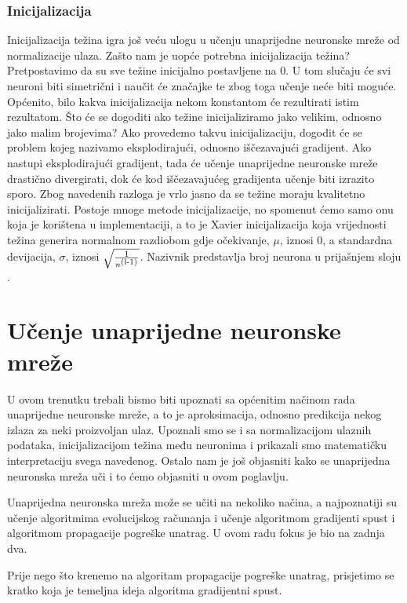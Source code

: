 \documentclass[times, utf8, zavrsni]{fer}
\begin{document}
\subsubsection{Inicijalizacija}
Inicijalizacija  težina igra još veću ulogu u učenju unaprijedne neuronske mreže od normalizacije ulaza. Zašto nam je uopće potrebna inicijalizacija težina? Pretpostavimo da su sve težine inicijalno postavljene na 0. U tom slučaju će svi neuroni biti simetrični i naučit će značajke te zbog toga učenje neće biti moguće. Općenito, bilo kakva inicijalizacija nekom konstantom će rezultirati istim rezultatom. Što će se dogoditi ako težine inicijaliziramo jako velikim, odnosno jako malim brojevima? Ako provedemo takvu inicijalizaciju, dogodit će se problem kojeg nazivamo eksplodirajući, odnosno iščezavajući gradijent. Ako nastupi eksplodirajući gradijent, tada će učenje unaprijedne neuronske mreže drastično divergirati, dok će kod iščezavajućeg gradijenta učenje biti izrazito sporo. Zbog navedenih razloga je vrlo jasno da se težine moraju kvalitetno inicijalizirati. Postoje mnoge metode inicijalizacije, no spomenut ćemo samo onu koja je korištena u implementaciji, a to je Xavier inicijalizacija koja vrijednosti težina generira normalnom razdiobom gdje očekivanje, $\mu$, iznosi 0, a standardna devijacija, $\sigma$, iznosi $\sqrt{\frac{1}{n\textsuperscript{(l-1)}}}$. Nazivnik predstavlja broj neurona u prijašnjem sloju \citep{init}.

\section{Učenje unaprijedne neuronske mreže}
U ovom trenutku trebali bismo biti upoznati sa općenitim načinom rada unaprijedne neuronske mreže, a to je aproksimacija, odnosno predikcija nekog izlaza za neki proizvoljan ulaz. Upoznali smo se i sa normalizacijom ulaznih podataka, inicijalizacijom težina među neuronima i prikazali smo matematičku interpretaciju svega navedenog. Ostalo nam je još objasniti kako se unaprijedna neuronska mreža uči i to ćemo objasniti u ovom poglavlju.

Unaprijedna neuronska mreža može se učiti na nekoliko načina, a najpoznatiji su učenje algoritmima evolucijskog računanja i učenje algoritmom gradijenti spust i algoritmom propagacije pogreške unatrag. U ovom radu fokus je bio na zadnja dva.

\bigskip

Prije nego što krenemo na algoritam propagacije pogreške unatrag, prisjetimo se kratko koja je temeljna ideja algoritma gradijentni spust.
\end{document}
